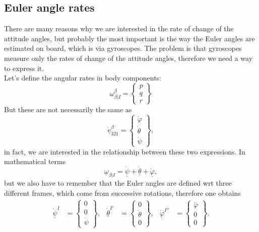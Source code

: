 \subsection{Euler angle rates}
There are many reasons why we are interested in the rate of change of the attitude angles, but probably the most important is the way the Euler angles are estimated on board, which is via gyroscopes. The problem is that gyroscopes measure only the rates of change of the attitude angles, therefore we need a way to express it.
\\
Let's define the angular rates in body components:
\begin{equation}
    \underline{\omega}_{\beta|I}^\beta = \begin{Bmatrix}
        p\\q\\r
    \end{Bmatrix}
\end{equation}
But these are not necessarily the same as 
\begin{equation}
    \underline{\dot e}_{321}^\beta = \begin{Bmatrix}
        \dot \varphi \\
        \dot \theta \\
        \dot \psi 
    \end{Bmatrix},
\end{equation}
in fact, we are interested in the relationship between these two expressions.
In mathematical terms
\begin{equation}
    \underline{\omega}_{\beta|I} = \underline{\dot \psi}+\underline{\dot \theta}+\underline{\dot \varphi},
\end{equation}
but we also have to remember that the Euler angles are defined wrt three different frames, which come from successive rotations, therefore one obtains
\begin{align}
    \underline{\dot \psi}^I &= \begin{Bmatrix}
        0\\0\\ \dot\psi
    \end{Bmatrix}, &
    \underline{\dot \theta}^{I'} &= \begin{Bmatrix}
        0\\ \dot \theta\\ 0
    \end{Bmatrix}, &
    \underline{\dot \varphi}^{I''} &= \begin{Bmatrix}
        \dot\varphi\\0\\ 0
    \end{Bmatrix}.
\end{align}

